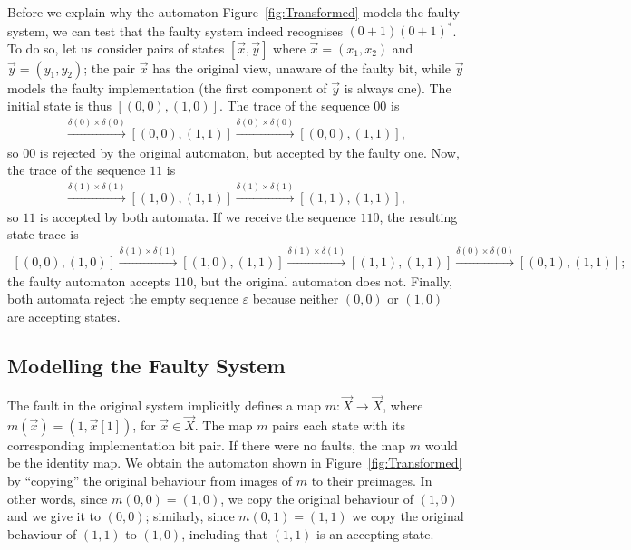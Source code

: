 Before we explain why the automaton Figure~\ref{fig:Transformed} models the faulty system, we can test that the faulty system indeed recognises $(0+1)(0+1)^*$. 
To do so, let us consider pairs of states $[\vec{x},\vec{y}]$ where $\vec{x}=(x_1,x_2)$ and $\vec{y}=(y_1,y_2)$; 
the pair $\vec{x}$ has the original view, unaware of the faulty bit, while $\vec{y}$ models the faulty implementation (the first component of $\vec{y}$ is always one). 
The initial state is thus $[(0,0),(1,0)]$. The trace of the sequence $00$ is 
\begin{align*}
   [(0,0),(1,0)]\xrightarrow{\delta(0)\times\delta(0)}[(0,0),(1,1)]\xrightarrow{\delta(0)\times\delta(0)}[(0,0),(1,1)],
\end{align*}
so $00$ is rejected by the original automaton, but accepted by the faulty one. 
Now, the trace of the sequence $11$ is 
\begin{align*}
   [(0,0),(1,0)]\xrightarrow{\delta(1)\times\delta(1)}[(1,0),(1,1)]\xrightarrow{\delta(1)\times\delta(1)}[(1,1),(1,1)],
\end{align*}
so $11$ is accepted by both automata. 
If we receive the sequence $110$, the resulting state trace is 
\begin{align*}
    [(0,0),(1,0)]\xrightarrow{\delta(1)\times\delta(1)}[(1,0),(1,1)]\xrightarrow{\delta(1)\times\delta(1)}[(1,1),(1,1)]\xrightarrow{\delta(0)\times\delta(0)}[(0,1),(1,1)];
\end{align*}
the faulty automaton accepts $110$, but the original automaton does not. Finally, both automata reject the empty sequence $\varepsilon$ because neither $(0,0)$ or $(1,0)$ are accepting states.

\subsection{Modelling the Faulty System}
The fault in the original system implicitly defines a map $m\colon \vec{X}\rightarrow\vec{X}$, where $m(\vec{x})=(1,\vec{x}[1])$, for $\vec{x}\in \vec{X}$. The map $m$ pairs each state with its corresponding implementation bit pair. If there were no faults, the map $m$ would be the identity map. 
We obtain the automaton shown in Figure~\ref{fig:Transformed} by ``copying'' the original behaviour from images of $m$ to their preimages. 
In other words, since $m(0,0)=(1,0)$, we copy the original behaviour of $(1,0)$ and we give it to $(0,0)$; similarly, since $m(0,1)=(1,1)$ we copy the original behaviour of $(1,1)$ to $(1,0)$, including that $(1,1)$ is an accepting state. 

